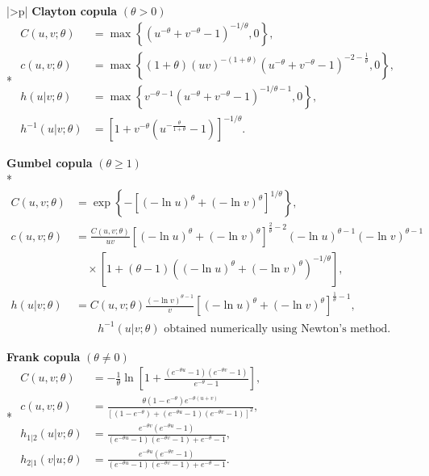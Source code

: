 \documentclass[12pt,oneside,a4paper]{book}
\theoremstyle{definition}
\theoremstyle{remark}
\begin{document}
{\begin{longtable}{|>{\centering\arraybackslash}p{\dimexpr{}\arrayrulewidth\relax}|}
		\textbf{Clayton copula} $\left(\theta>0\right)$ \\*
		\smallskip
		\(\displaystyle\begin{aligned}
			C(u,v;\theta) &= \max\left\{ \left(u^{-\theta}+v^{-\theta}-1 \right)^{-1/\theta}, 0 \right\}, \\
			c(u,v;\theta) &= \max\left\{ (1+\theta) (uv)^{-(1+\theta)} \left( u^{-\theta}+v^{-\theta}-1 \right)^{-2-\frac{1}{\theta}}, 0 \right\}, \\
			h(u|v;\theta) &= \max\left\{ v^{-\theta-1} \left( u^{-\theta}+v^{-\theta}-1 \right)^{-1/\theta-1}, 0 \right\}, \\
			h^{-1}(u|v;\theta) &= \left[ 1+ v^{-\theta} \left( u^{-\frac{\theta}{1+\theta}}-1 \right) \right]^{-1/\theta}.
		\end{aligned}\)
		\smallskip \\
		\hline

		\textbf{Gumbel copula} $\left(\theta\geq1\right)$ \\*
		\smallskip
		\(\displaystyle\begin{aligned}
			C(u,v;\theta) &= \exp\left\{ -\left[ (-\ln u)^\theta+ (-\ln v)^\theta \right]^{1/\theta} \right\}, \\
			c(u,v;\theta) &= \frac{C(u,v;\theta)}{uv} \left[ (-\ln u)^\theta+ (-\ln v)^\theta \right]^{\frac{2}{\theta}-2} (-\ln u)^{\theta-1} (-\ln v)^{\theta-1} \\
			&\quad\times \left[ 1+ (\theta-1) \left( (-\ln u)^\theta+ (-\ln v)^\theta \right)^{-1/\theta} \right], \\
			h(u|v;\theta) &= C(u,v;\theta) \frac{ (-\ln v)^{\theta-1} }{ v } \left[ (-\ln u)^\theta+ (-\ln v)^\theta \right]^{\frac{1}{\theta}-1}, \\
			&\qquad h^{-1}(u|v;\theta) \text{ obtained numerically using Newton's method}.
		\end{aligned}\)
		\smallskip \\
		\hline

		\textbf{Frank copula} $\left(\theta\neq0\right)$ \\*
		\smallskip
		\(\displaystyle\begin{aligned}
			C(u,v;\theta) &= -\frac{1}{\theta} \ln\left[ 1+ \frac{ (e^{-\theta u}-1) (e^{-\theta v}-1) }{ e^{-\theta}-1 } \right], \\
			c(u,v;\theta) &= \frac{ \theta(1-e^{-\theta}) e^{-\theta(u+v)} }{ \left[ (1-e^{-\theta}) + (e^{-\theta u}-1) (e^{-\theta v}-1) \right]^2 }, \\
			h_{1|2}(u|v;\theta) &= \frac{ e^{-\theta v} (e^{-\theta u}-1) }{ (e^{-\theta u}-1) (e^{-\theta v}-1) + e^{-\theta}-1 }, \\
			h_{2|1}(v|u;\theta) &= \frac{ e^{-\theta u} (e^{-\theta v}-1) }{ (e^{-\theta u}-1) (e^{-\theta v}-1) + e^{-\theta}-1 }.
		\end{aligned}\)
		\smallskip \\
		\hline


\end{longtable}}
\end{document}
